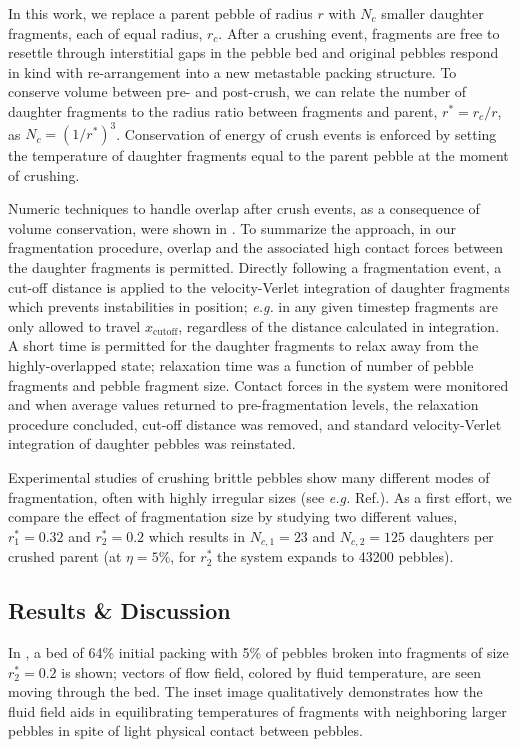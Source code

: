In this work, we replace a parent pebble of radius $r$ with $N_c$ smaller daughter fragments, each of equal radius, $r_c$. After a crushing event, fragments are free to resettle through interstitial gaps in the pebble bed and original pebbles respond in kind with re-arrangement into a new metastable packing structure.  To conserve volume between pre- and post-crush, we can relate the number of daughter fragments to the radius ratio between fragments and parent, $r^* = r_c/r$, as $N_c = (1/r^*)^{3}$. Conservation of energy of crush events is enforced by setting the temperature of daughter fragments equal to the parent pebble at the moment of crushing. 

Numeric techniques to handle overlap after crush events, as a consequence of volume conservation, were shown in . To summarize the approach, in our fragmentation procedure, overlap and the associated high contact forces between the daughter fragments is permitted. Directly following a fragmentation event, a cut-off distance is applied to the velocity-Verlet integration of daughter fragments which prevents instabilities in position; \textit{e.g.} in any given timestep fragments are only allowed to travel $x_\text{cutoff}$, regardless of the distance calculated in integration. A short time is permitted for the daughter fragments to relax away from the highly-overlapped state; relaxation time was a function of number of pebble fragments and pebble fragment size. Contact forces in the system were monitored and when average values returned to pre-fragmentation levels, the relaxation procedure concluded, cut-off distance was removed, and standard velocity-Verlet integration of daughter pebbles was reinstated.

Experimental studies of crushing brittle pebbles show many different modes of fragmentation, often with highly irregular sizes (see \textit{e.g.} Ref.\cite{Wu2004}). As a first effort, we compare the effect of fragmentation size by studying two different values, $r^*_1 = 0.32$ and $r^*_2 = 0.2$ which results in $N_{c,1} = 23$ and $N_{c,2} = 125$ daughters per crushed parent (at $\eta = 5\%$, for $r_2^*$ the system expands to \num{43200} pebbles). 









\subsection{Results \& Discussion}
In , a bed of 64\% initial packing with 5\% of pebbles broken into fragments of size $r_2^* = 0.2$ is shown; vectors of flow field, colored by fluid temperature, are seen moving through the bed. The inset image qualitatively demonstrates how the fluid field aids in equilibrating temperatures of fragments with neighboring larger pebbles in spite of light physical contact between pebbles. 


